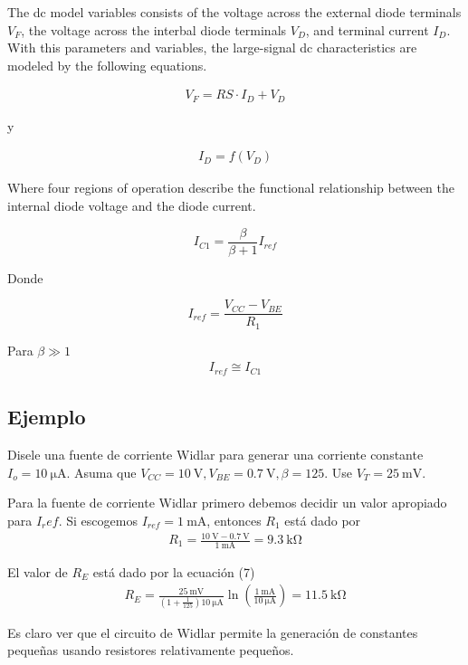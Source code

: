 \documentclass[12pt]{article}
\begin{document}
	The dc model variables consists of the voltage across the external diode terminals $V_F$, the voltage  across the interbal diode terminals $V_D$, and terminal current $I_D$. With this parameters and variables, the large-signal dc characteristics are modeled by the following equations. 
	
	\begin{align}
		V_F = RS \cdot I_D + V_D
	\end{align}

	\noindent y
	
	\begin{align}
		I_D = f(V_D)
	\end{align}
	
	\noindent Where four regions of operation describe the functional relationship between the internal diode voltage and the diode current.
	
	\begin{tcolorbox}[colback=red!5!white,colframe=red!75!black,arc=0mm,boxrule=0mm,width=(\linewidth+0.5cm)]
		\begin{equation}
			I_{C1} = \frac{\beta}{\beta + 1}I_{ref}
		\end{equation}
	\end{tcolorbox}
	
	\noindent Donde
	\begin{tcolorbox}[colback=red!5!white,colframe=red!75!black,arc=0mm,boxrule=0mm,width=(\linewidth+0.5cm)]
		\begin{equation}
			I_{ref} = \frac{V_{CC} - V_{BE}}{R_1}
		\end{equation}
	\end{tcolorbox}
	
	\noindent Para $\beta \gg 1$
	\begin{align}
		I_{ref} \cong I_{C1}
	\end{align}
	
	\subsection*{Ejemplo}
	Disele una fuente de corriente Widlar para generar una corriente constante $I_o = \SI{10}{\micro\ampere}$. Asuma que $V_{CC} = \SI{10}{\volt}, V_{BE} = \SI{0.7}{\volt}, \beta=125$. Use $V_T = \SI{25}{\milli\volt}$.
	
	
	\noindent Para la fuente de corriente Widlar primero debemos decidir un valor apropiado para $I_ref$. Si escogemos $I_{ref} = \SI{1}{\milli\ampere}$, entonces $R_1$ está dado por
	\begin{align}
		R_1 = \frac{\SI{10}{\volt} - \SI{0.7}{\volt}}{\SI{1}{\milli\ampere}} = \SI{9.3}{\kilo\ohm}
	\end{align}
	
	\noindent El valor de $R_E$ está dado por la ecuación (7)
	\begin{align}
		R_E = \frac{\SI{25}{\milli\volt}}{\left(1 + \frac{1}{125}\right)\SI{10}{\micro\ampere}}\ln \left( \frac{\SI{1}{\milli\ampere}}{\SI{10}{\micro\ampere}} \right) = \SI{11.5}{\kilo\ohm}
	\end{align}
	
	\noindent Es claro ver que el circuito de Widlar permite la generación de constantes pequeñas usando resistores relativamente pequeños.
\end{document}
